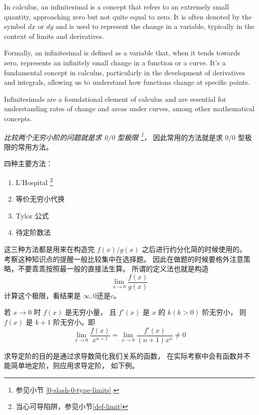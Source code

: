\begin{definition}
    In calculus, an infinitesimal is a concept that refers 
    to an extremely small quantity, approaching zero 
    but not quite equal to zero. It is often denoted 
    by the symbol $dx$ or $dy$ and is used to represent 
    the change in a variable, typically in the context of 
    limits and derivatives.

    Formally, an infinitesimal is defined as a variable that, 
    when it tends towards zero, represents an infinitely 
    small change in a function or a curve. 
    It's a fundamental concept in calculus, 
    particularly in the development of derivatives and integrals, 
    allowing us to understand how functions change at specific points.

    Infinitesimals are a foundational element of calculus and 
    are essential for understanding rates of 
    change and areas under curves, among other mathematical concepts.
\end{definition}

\emph{比较两个无穷小阶的问题就是求 0/0 型极限
    \footnote{参见小节 \ref{0-slash-0-type-limits}.}，
}
因此常用的方法就是求 0/0 型极限的常用方法。

四种主要方法：
\begin{enumerate}
    \item L'Hospital \footnote{当心可导陷阱，参见小节\ref{def-limit}}
	\item 等价无穷小代换
	\item Tylor 公式
    \item 待定阶数法
\end{enumerate}

这三种方法都是用来在构造完 $f(x)/g(x)$ 之后进行约分化简的时候使用的。
考察这种知识点的提醒一般比较集中在选择题。
因此在做题的时候要格外注意策略，不要乖乖按照最一般的直接法生算。
所谓的定义法也就是构造
\[
    \lim_{x\to 0} \dfrac{f(x)}{g(x)}
\]
计算这个极限，看结果是 $\infty, 0$还是$c$。 

\begin{lemma}[L'Hospital求导定阶]
	若 $x \to 0$ 时 $f(x)$ 是无穷小量，
    且 $f'(x)$ 是 $x$ 的 $k(k>0)$ 阶无穷小，
	则 $f(x)$ 是 $k+1$ 阶无穷小。即
	\begin{equation}
		\lim_{x \to 0} \dfrac{f(x)}{x^{n+1}} 
        = 
        \lim_{x \to 0} \dfrac{f'(x)}{(n+1)x^{n}} \neq 0
	\end{equation}
\end{lemma}

求导定阶的目的是通过求导数简化我们关系的函数，
在实际考察中会有函数并不能简单地定阶，则应用求导定阶，
如下例。

